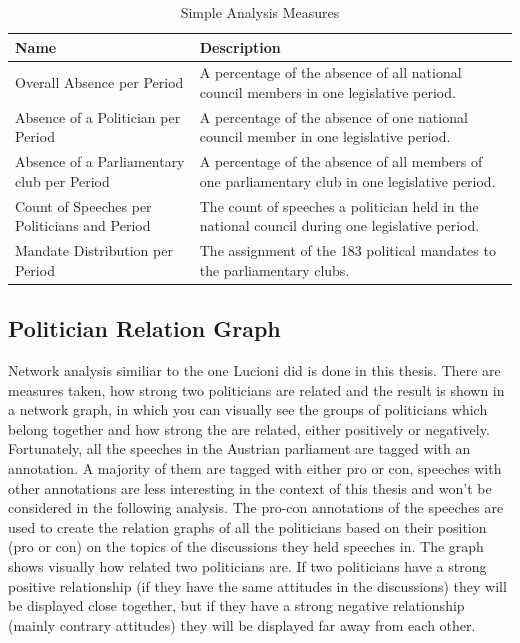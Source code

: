 \begin{table}[h]

\bgroup
\def\arraystretch{1.2}
\begin{tabular}{| p{5cm} | p{8cm} |}
\hline
  Name & Description \\
\hline
\hline
  Overall Absence per Period & A percentage of the absence of all national council members in one legislative period. \\
\hline
Absence of a Politician per Period & A percentage of the absence of one national council member in one legislative period. \\
\hline
Absence of a Parliamentary club per Period & A percentage of the absence of all members of one parliamentary club in one legislative period. \\
\hline
Count of Speeches per Politicians and Period & The count of speeches a politician held in the national council during one legislative period. \\
\hline
Mandate Distribution per Period & The assignment of the 183 political mandates to the parliamentary clubs. \\
\hline

\end{tabular}
\egroup

\caption{Simple Analysis Measures}
\label{table:simple_analysis}
\end{table}

\subsection{Politician Relation Graph}
Network analysis similiar to the one Lucioni \cite{Lucioni_2015} did is done in this thesis. There are measures taken, how strong two politicians are related and the result is shown in a network graph, in which you can visually see the groups of politicians which belong together and how strong the are related, either positively or negatively. Fortunately, all the speeches in the Austrian parliament are tagged with an annotation. A majority of them are tagged with either pro or con, speeches with other annotations are less interesting in the context of this thesis and won't be considered in the following analysis. The pro-con annotations of the speeches are used to create the relation graphs of all the politicians based on their position (pro or con) on the topics of the discussions they held speeches in. The graph shows visually how related two politicians are. If two politicians have a strong positive relationship (if they have the same attitudes in the discussions) they will be displayed close together, but if they have a strong negative relationship (mainly contrary attitudes) they will be displayed far away from each other.

